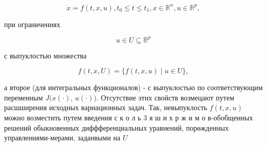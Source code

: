 \documentclass[10pt]{article}
\begin{document}
\[
\dot{x}=f(t, x, u), t_{0} \leqslant t \leqslant t_{1}, x \in \mathbb{R}^{n}, u \in \mathbb{R}^{p},
\]

при ограничениях

\[
u \in U \subseteq \mathbb{R}^{p}
\]

с выпуклостью множества

\[
f(t, x, U)=\{f(t, x, u) \mid u \in U\},
\]

а второе (для интегральных функционалов) - с выпуклостью по соответствующим переменным $J(x(\cdot)$, $u(\cdot))$. Отсутствие этих свойств возмецают путем расшширения исходных вариационных задач. Так, невыпуклость $f(t, x, u)$ можно возместить путем введения с к о л ь 3 я ш и х р ж и м о в-обобщенных решений обыкновенных диффференциальных уравнений, порөжденных управлениями-мерами, заданвыми на $U$
\end{document}
